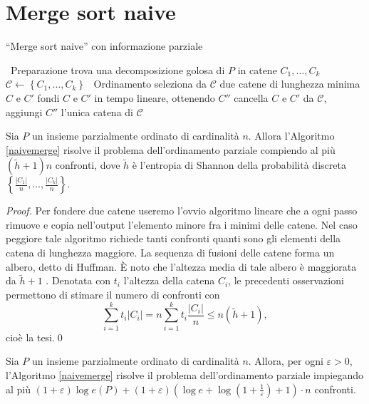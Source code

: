\section{Merge sort naive} 
\begin{algorithm}
	\caption{``Merge sort naive'' con informazione parziale} \label{naivemerge} 
	\begin{algorithmic}
		[1] \STATE \, \COMMENT Preparazione \STATE trova una decomposizione golosa di \(P\) in catene \(C_1,\dots,C_k\) \STATE \(\mathcal{C}\leftarrow\left\{C_1,\dots,C_k\right\}\) \STATE \, \COMMENT Ordinamento  \STATE seleziona da \(\mathcal{C}\) due catene di lunghezza minima \(C\) e \(C'\) \STATE fondi \(C\) e \(C'\) in tempo lineare, ottenendo \(C''\) \STATE cancella \(C\) e \(C'\) da \(\mathcal{C}\), aggiungi \(C''\) \ENDWHILE \RETURN l'unica catena di \(\mathcal{C}\) 
	\end{algorithmic}
\end{algorithm}
\begin{lemma}
	\label{naivemergelemma} Sia \(P\) un insieme parzialmente ordinato di cardinalità \(n\). Allora l'Algoritmo \ref{naivemerge} risolve il problema dell'ordinamento parziale compiendo al più \((\tilde{h}+1)n\) confronti, dove \(\tilde{h}\) è l'entropia di Shannon della probabilità discreta \(\left\{\frac{|C_1|}{n},\dots,\frac{|C_k|}{n}\right\}\). 
\end{lemma}
\begin{proof}
	Per fondere due catene useremo l'ovvio algoritmo lineare che a ogni passo rimuove e copia nell'output l'elemento minore fra i minimi delle catene. Nel caso peggiore tale algoritmo richiede tanti confronti quanti sono gli elementi della catena di lunghezza maggiore. La sequenza di fusioni delle catene forma un albero, detto di Huffman. È noto che l'altezza media di tale albero è maggiorata da \(\tilde{h}+1\) \cite{Cover2006}. Denotata con \(t_i\) l'altezza della catena \(C_i\), le precedenti osservazioni permettono di stimare il numero di confronti con
	\[\sum_{i=1}^{k}{t_i|C_i|}=n\sum_{i=1}^{k}{t_i\frac{|C_i|}{n}}\le n(\tilde{h}+1),\]
	cioè la tesi.\qed 
\end{proof}
\begin{theorem}
	\label{naivemergetheorem} Sia \(P\) un insieme parzialmente ordinato di cardinalità \(n\). Allora, per ogni \(\varepsilon>0\), l'Algoritmo \ref{naivemerge} risolve il problema dell'ordinamento parziale impiegando al più \((1+\varepsilon)\log{e(P)}+(1+\varepsilon)\left(\log{e}+\log{\left(1+\frac{1}{\varepsilon}\right)}+1\right)\cdot n\) confronti. 
\end{theorem}
